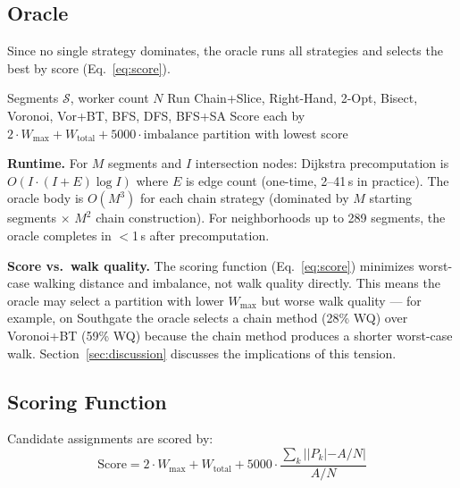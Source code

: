 \documentclass[conference]{IEEEtran}
\begin{document}
\subsection{Oracle}
\label{sec:oracle}

Since no single strategy dominates, the oracle runs all strategies and selects the best by score (Eq.~\ref{eq:score}).

\begin{algorithm}[htbp]
\caption{Oracle}
\label{alg:oracle}
\begin{algorithmic}[1]
\REQUIRE Segments $\mathcal{S}$, worker count $N$
\STATE Run Chain+Slice, Right-Hand, 2-Opt, Bisect, Voronoi, Vor+BT, BFS, DFS, BFS+SA
\STATE Score each by $2 \cdot W_{\max} + W_{\text{total}} + 5000 \cdot \text{imbalance}$
\RETURN partition with lowest score
\end{algorithmic}
\end{algorithm}

\textbf{Runtime.} For $M$ segments and $I$ intersection nodes: Dijkstra precomputation is $O(I \cdot (I + E) \log I)$ where $E$ is edge count (one-time, 2--41\,s in practice). The oracle body is $O(M^3)$ for each chain strategy (dominated by $M$ starting segments $\times$ $M^2$ chain construction). For neighborhoods up to 289 segments, the oracle completes in $<$1\,s after precomputation.

\textbf{Score vs.\ walk quality.} The scoring function (Eq.~\ref{eq:score}) minimizes worst-case walking distance and imbalance, not walk quality directly. This means the oracle may select a partition with lower $W_{\max}$ but worse walk quality --- for example, on Southgate the oracle selects a chain method (28\% WQ) over Voronoi+BT (59\% WQ) because the chain method produces a shorter worst-case walk. Section~\ref{sec:discussion} discusses the implications of this tension.

\subsection{Scoring Function}
\label{sec:scoring}

Candidate assignments are scored by:
\begin{equation}
\text{Score} = 2 \cdot W_{\max} + W_{\text{total}} + 5000 \cdot \frac{\sum_k ||P_k| - A/N|}{A/N}
\label{eq:score}
\end{equation}
\end{document}
